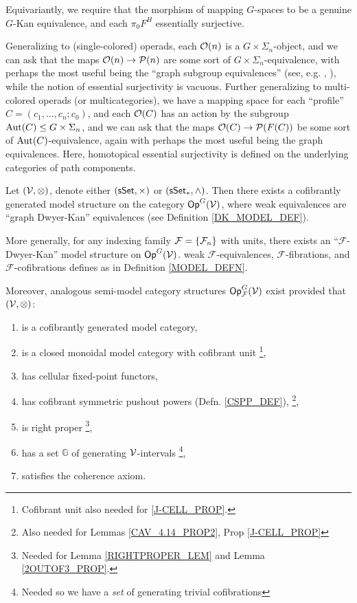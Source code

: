 \documentclass[a4paper,10pt
,draft
]{article}%
\renewcommand{\F}{\mathcal F}
\renewcommand{\1}{\eta}%
\begin{document}
Equivariantly, we require that the morphism of mapping $G$-spaces to be a genuine $G$-Kan equivalence, and
each $\pi_0F^H$ essentially surjective.

Generalizing to (single-colored) operads,
each $\mathcal{O}(n)$ is a $G \times \Sigma_n$-object, and we can ask that the maps $\mathcal{O}(n) \to \mathcal{P}(n)$ are some sort of $G \times \Sigma_n$-equivalence,
with perhaps the most useful being the ``graph subgroup equivalences'' (see, e.g. \cite{BP_geo}, \cite{BH15}),
while the notion of essential surjectivity is vacuous.
Further generalizing to multi-colored operads (or multicategories),
we have a mapping space for each ``profile'' $C = (c_1, \dots, c_n; c_0)$,
and each $\mathcal{O}(C)$ has an action by the subgroup $\operatorname{Aut}(C) \leq G \times \Sigma_n$,
and we can ask that the maps $\mathcal{O}(C) \to \mathcal{P}(F(C))$ be some sort of $\operatorname{Aut}(C)$-equivalence,
again with perhaps the most useful being the graph equivalences.
Here, homotopical essential surjectivity is defined on the underlying categories of path components.

\begin{theorem}
      \label{INTRO_MODEL_THM}
      Let $(\mathcal V, \otimes)$, denote either $(\mathsf{sSet}, \times)$ or $(\sSet_{\**}, \wedge)$.
      Then there exists a cofibrantly generated model structure on the category $\mathsf{Op}^G(\mathcal V)$,
      where weak equivalences are ``graph Dwyer-Kan'' equivalences (see Definition \ref{DK_MODEL_DEF}). 

      More generally, for any indexing family $\F = \set{\F_n}$ with units,
      there exists an ``$\F$-Dwyer-Kan'' model structure on $\mathsf{Op}^G(\mathcal V)$.
      weak $\F$-equivalences, $\F$-fibrations, and $\F$-cofibrations defines as in Definition \ref{MODEL_DEFN}.
           
      Moreover, analogous semi-model category structures $\Op^G_\F(\V)$ exist
      provided that $(\mathcal V, \otimes)$:
      \begin{enumerate}[label = (\roman*)]\itemsep-4pt
      \item is a cofibrantly generated model category,
      \item is a closed monoidal model category with cofibrant unit
            \footnote{Cofibrant unit also needed for \ref{J-CELL_PROP}.},
      \item has cellular fixed-point functors,
      \item \label{I_CSPP_LBL} has cofibrant symmetric pushout powers  (Defn. \ref{CSPP_DEF}),
            \footnote{Also needed for Lemmas \ref{CAV_4.14_PROP2}, Prop \ref{J-CELL_PROP}}, %
      \item \label{I_RP_LBL} is right proper
            \footnote{Needed for Lemma \ref{RIGHTPROPER_LEM} and Lemma \ref{2OUTOF3_PROP}.},
      \item \label{I_GENSET_LBL} has a set $\mathbb{G}$ of generating $\mathcal V$-intervals
            \footnote{Needed so we have a \textit{set} of generating trivial cofibrations},
      \item satisfies the coherence axiom.
      \end{enumerate}
\end{theorem}
\end{document}
